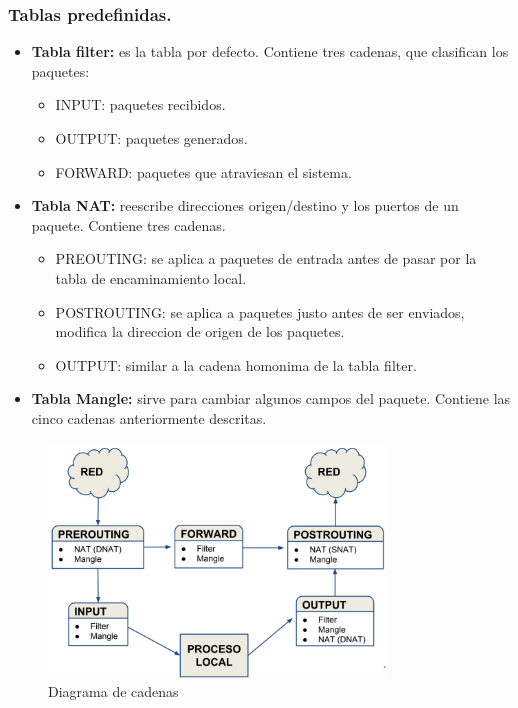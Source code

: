 \begin{onepage}
\subsubsection{Tablas predefinidas.}
\begin{itemize}
    \item \textbf{Tabla filter: }es la tabla por defecto. Contiene tres cadenas, que clasifican los paquetes:
        \begin{itemize}
            \item INPUT: paquetes recibidos.
            \item OUTPUT: paquetes generados.
            \item FORWARD: paquetes que atraviesan el sistema.
        \end{itemize}
    
    \item \textbf{Tabla NAT: }reescribe direcciones origen/destino y los puertos de un paquete. Contiene tres cadenas.
            \begin{itemize}
                \item PREOUTING: se aplica a paquetes de entrada antes de pasar por la tabla de encaminamiento local.
                \item POSTROUTING: se aplica a paquetes justo antes de ser enviados, modifica la direccion de origen de los paquetes.
                \item OUTPUT: similar a la cadena homonima de la tabla filter.
            \end{itemize}
    \item \textbf{Tabla Mangle: }sirve para cambiar algunos campos del paquete. Contiene las cinco cadenas anteriormente descritas.
    \end{itemize}
    \begin{figure}[H]
        \centering
        \includegraphics[width=0.8\textwidth]{img/GraficoCadenas.PNG}
        \caption{Diagrama de cadenas}
    \end{figure}
    \end{onepage}
